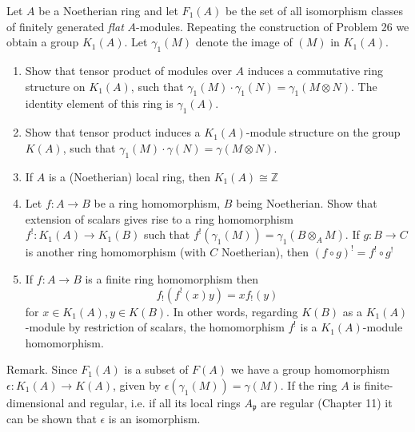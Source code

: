 \documentclass{solution}
\begin{document}
\begin{problem}
    Let $A$ be a Noetherian ring and let $F_1(A)$ be the set of all isomorphism classes of finitely generated \textit{flat} $A$-modules. Repeating the construction of Problem 26 we obtain a group $K_1(A)$. Let $\gamma_1(M)$ denote the image of $(M)$ in $K_1(A)$.
    \begin{enumerate}
        \item Show that tensor product of modules over $A$ induces a commutative ring structure on $K_1(A)$, such that $\gamma_1(M) \cdot \gamma_1(N) = \gamma_1(M \otimes N)$. The identity element of this ring is $\gamma_1(A)$.
        \item Show that tensor product induces a $K_1(A)$-module structure on the group $K(A)$, such that $\gamma_1(M) \cdot \gamma(N) = \gamma(M \otimes N)$.
        \item If $A$ is a (Noetherian) local ring, then $K_1(A) \cong \mathbb{Z}$
        \item Let $f: A \rightarrow B$ be a ring homomorphism, $B$ being Noetherian. Show that extension of scalars gives rise to a ring homomorphism $f^{!}: K_1(A) \rightarrow K_1(B)$ such that $f^{!}(\gamma_1(M)) = \gamma_1(B \otimes_A M)$. If $g: B \rightarrow C$ is another ring homomorphism (with $C$ Noetherian), then $(f \circ g)^{!} = f^{!} \circ g^{!}$
        \item If $f: A \rightarrow B$ is a finite ring homomorphism then
        $$f_{!}(f^{!}(x)y) = x f_{!}(y)$$
        for $x \in K_1(A), y \in K(B)$. In other words, regarding $K(B)$ as a $K_1(A)$-module by restriction of scalars, the homomorphism $f^{!}$ is a $K_1(A)$-module homomorphism.
    \end{enumerate}
    Remark. Since $F_1(A)$ is a subset of $F(A)$ we have a group homomorphism $\epsilon: K_1(A) \rightarrow K(A)$, given by $\epsilon(\gamma_1(M)) = \gamma(M)$. If the ring $A$ is finite-dimensional and regular, i.e. if all its local rings $A_{\mathfrak{p}}$ are regular (Chapter 11) it can be shown that $\epsilon$ is an isomorphism.
\end{problem}
\end{document}
